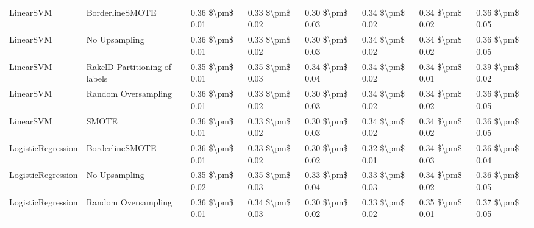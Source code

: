 \begin{tabular}{llllllll}
                      LinearSVM &               BorderlineSMOTE & 0.36 \$\textbackslash pm\$ 0.01 &           0.33 \$\textbackslash pm\$ 0.02 &       0.30 \$\textbackslash pm\$ 0.03 &        0.34 \$\textbackslash pm\$ 0.02 &                         0.34 \$\textbackslash pm\$ 0.02 &     0.36 \$\textbackslash pm\$ 0.05 \\
                      LinearSVM &                 No Upsampling & 0.36 \$\textbackslash pm\$ 0.01 &           0.33 \$\textbackslash pm\$ 0.02 &       0.30 \$\textbackslash pm\$ 0.03 &        0.34 \$\textbackslash pm\$ 0.02 &                         0.34 \$\textbackslash pm\$ 0.02 &     0.36 \$\textbackslash pm\$ 0.05 \\
                      LinearSVM & RakelD Partitioning of labels & 0.35 \$\textbackslash pm\$ 0.01 &           0.35 \$\textbackslash pm\$ 0.03 &       0.34 \$\textbackslash pm\$ 0.04 &        0.34 \$\textbackslash pm\$ 0.02 &                         0.34 \$\textbackslash pm\$ 0.01 &     0.39 \$\textbackslash pm\$ 0.02 \\
                      LinearSVM &           Random Oversampling & 0.36 \$\textbackslash pm\$ 0.01 &           0.33 \$\textbackslash pm\$ 0.02 &       0.30 \$\textbackslash pm\$ 0.03 &        0.34 \$\textbackslash pm\$ 0.02 &                         0.34 \$\textbackslash pm\$ 0.02 &     0.36 \$\textbackslash pm\$ 0.05 \\
                      LinearSVM &                         SMOTE & 0.36 \$\textbackslash pm\$ 0.01 &           0.33 \$\textbackslash pm\$ 0.02 &       0.30 \$\textbackslash pm\$ 0.03 &        0.34 \$\textbackslash pm\$ 0.02 &                         0.34 \$\textbackslash pm\$ 0.02 &     0.36 \$\textbackslash pm\$ 0.05 \\
             LogisticRegression &               BorderlineSMOTE & 0.36 \$\textbackslash pm\$ 0.01 &           0.33 \$\textbackslash pm\$ 0.02 &       0.30 \$\textbackslash pm\$ 0.02 &        0.32 \$\textbackslash pm\$ 0.01 &                         0.34 \$\textbackslash pm\$ 0.03 &     0.36 \$\textbackslash pm\$ 0.04 \\
             LogisticRegression &                 No Upsampling & 0.35 \$\textbackslash pm\$ 0.02 &           0.35 \$\textbackslash pm\$ 0.03 &       0.33 \$\textbackslash pm\$ 0.04 &        0.33 \$\textbackslash pm\$ 0.03 &                         0.34 \$\textbackslash pm\$ 0.02 &     0.36 \$\textbackslash pm\$ 0.05 \\
             LogisticRegression &           Random Oversampling & 0.36 \$\textbackslash pm\$ 0.01 &           0.34 \$\textbackslash pm\$ 0.03 &       0.30 \$\textbackslash pm\$ 0.02 &        0.33 \$\textbackslash pm\$ 0.02 &                         0.35 \$\textbackslash pm\$ 0.01 &     0.37 \$\textbackslash pm\$ 0.05 \\

\end{tabular}
